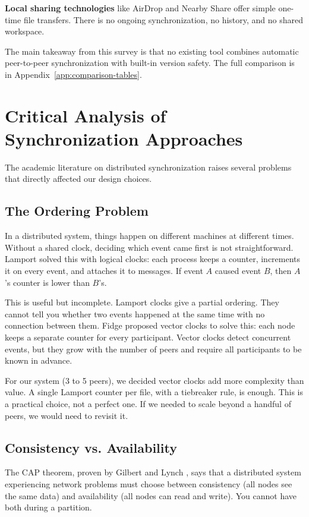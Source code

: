 \textbf{Local sharing technologies} like AirDrop and Nearby Share offer simple one-time file transfers. There is no ongoing synchronization, no history, and no shared workspace.

The main takeaway from this survey is that no existing tool combines automatic peer-to-peer synchronization with built-in version safety. The full comparison is in Appendix~\ref{app:comparison-tables}.

\section{Critical Analysis of Synchronization Approaches}

The academic literature on distributed synchronization raises several problems that directly affected our design choices.

\subsection{The Ordering Problem}

In a distributed system, things happen on different machines at different times. Without a shared clock, deciding which event came first is not straightforward. Lamport \citeyear{lamport1978} solved this with logical clocks: each process keeps a counter, increments it on every event, and attaches it to messages. If event $A$ caused event $B$, then $A$'s counter is lower than $B$'s.

This is useful but incomplete. Lamport clocks give a partial ordering. They cannot tell you whether two events happened at the same time with no connection between them. Fidge \citeyear{fidge1988} proposed vector clocks to solve this: each node keeps a separate counter for every participant. Vector clocks detect concurrent events, but they grow with the number of peers and require all participants to be known in advance.

For our system (3 to 5 peers), we decided vector clocks add more complexity than value. A single Lamport counter per file, with a tiebreaker rule, is enough. This is a practical choice, not a perfect one. If we needed to scale beyond a handful of peers, we would need to revisit it.

\subsection{Consistency vs. Availability}

The CAP theorem, proven by Gilbert and Lynch \citeyear{brewer2002}, says that a distributed system experiencing network problems must choose between consistency (all nodes see the same data) and availability (all nodes can read and write). You cannot have both during a partition.

